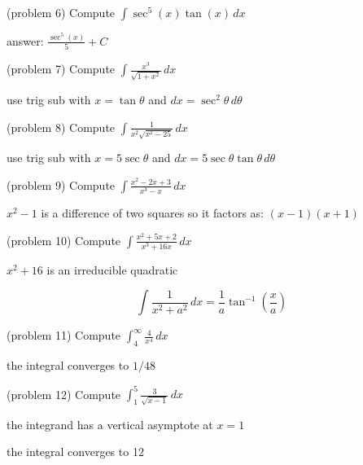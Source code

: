 \documentclass[handout]{ximera}
\begin{document}
\begin{problem}(problem 6)
Compute $\displaystyle \int \sec^5(x) \tan(x)  \, dx$

\begin{hint}
answer: $\displaystyle \frac{\sec^5(x)}{5} + C$
\end{hint}

\end{problem}


\begin{problem}(problem 7)
Compute $\displaystyle \int \frac{x^3}{ \sqrt{1+x^2}} \, dx$

\begin{hint}
use trig sub with $x = \tan \theta$ and $dx =  \sec^2 \theta \, d\theta$
\end{hint}

\end{problem}


\begin{problem}(problem 8)
Compute $\displaystyle \int \frac{1}{x^2 \sqrt{x^2 - 25}} \, dx$

\begin{hint}
use trig sub with $x = 5\sec \theta$ and $dx = 5 \sec \theta \tan \theta \, d\theta$
\end{hint}

\end{problem}


\begin{problem}(problem 9)
Compute $\displaystyle \int \frac{x^2 - 2x+3}{x^3-x} \, dx$

\begin{hint}
$x^2 - 1$ is a difference of two squares so it factors as: $(x-1)(x+1)$
\end{hint}

\end{problem}


\begin{problem}(problem 10)
Compute $\displaystyle \int \frac{x^2 + 5x + 2}{x^3 + 16x} \, dx$

\begin{hint}
$x^2 + 16$ is an irreducible quadratic
\end{hint}

\begin{hint}
\[
\int \frac{1}{x^2 + a^2} \, dx = \frac{1}{a} \tan^{-1}\left(\frac{x}{a}\right)
\]
\end{hint}

\end{problem}


\begin{problem}(problem 11)
Compute $\displaystyle \int_4^\infty \frac{4}{x^4} \, dx$

\begin{hint}
the integral converges to $1/48$
\end{hint}

\end{problem}


\begin{problem}(problem 12)
Compute $\displaystyle \int_1^5 \frac{3}{\sqrt{x-1}} \, dx$

\begin{hint}
the integrand has a vertical asymptote at $x = 1$
\end{hint}

\begin{hint}
the integral converges to 12
\end{hint}


\end{problem}
\end{document}
